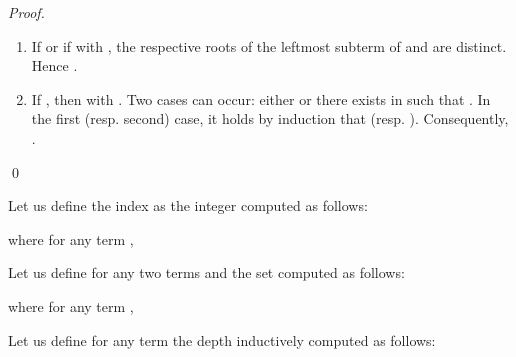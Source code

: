 \documentclass[a4paper]{llncs}
\begin{document}
\begin{proof}
\begin{enumerate}
\begin{enumerate}
\begin{enumerate}
\begin{enumerate}
    \item If  or if  with , the respective roots of the leftmost subterm of   and  are distinct. Hence .
    
    \item If , then  with . 
    Two cases can occur: either  or there exists  in  such that . 
    In the first (resp. second) case, it holds by induction that  (resp. ). Consequently, . 
    \end{enumerate}
    \end{enumerate}
    \end{enumerate}
    \end{enumerate}  
    \qed
  \end{proof}
  
  \begin{definition}
        Let us define the index  as the integer computed as follows:
        
        where for any term ,
        
    Let us define for any two terms  and  the set  computed as follows:
        
        where for any term ,
        
    Let us define for any term  the depth  inductively computed as follows:
        
  \end{definition}
  
\end{document}
